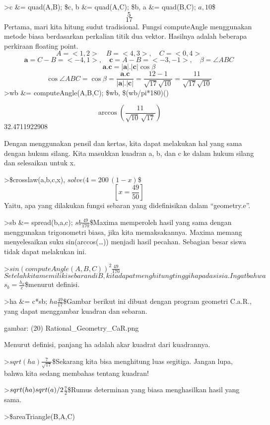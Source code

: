 \documentclass[
]{book}
\begin{document}
\textgreater c \&= quad(A,B); \$c, b \&= quad(A,C); \$b, a \&= quad(B,C); \(a,\)\(10\)\$ \[5\] \[17\]Pertama, mari kita hitung sudut tradisional. Fungsi computeAngle menggunakan metode biasa berdasarkan perkalian titik dua vektor. Hasilnya adalah beberapa perkiraan floating point. \[A=<1,2>\quad B=<4,3>,\quad C=<0,4>\] \[\mathbf{a}=C-B=<-4,1>,\quad \mathbf{c}=A-B=<-3,-1>,\quad \beta=\angle ABC\] \[\mathbf{a}.\mathbf{c}=|\mathbf{a}|.|\mathbf{c}|\cos \beta\] \[\cos \angle ABC =\cos\beta=\frac{\mathbf{a}.\mathbf{c}}{|\mathbf{a}|.|\mathbf{c}|}=\frac{12-1}{\sqrt{17}\sqrt{10}}=\frac{11}{\sqrt{17}\sqrt{10}}\] \textgreater wb \&= computeAngle(A,B,C); \$wb, \$(wb/pi*180)()

\[\arccos \left(\frac{11}{\sqrt{10}\,\sqrt{17}}\right)\] 32.4711922908

Dengan menggunakan pensil dan kertas, kita dapat melakukan hal yang sama dengan hukum silang. Kita masukkan kuadran a, b, dan c ke dalam hukum silang dan selesaikan untuk x.

\textgreater\$crosslaw(a,b,c,x), \(solve(%
\)\(4=200\,\left(1-x\right)\)\$ \[\left[ x=\frac{49}{50} \right]\]Yaitu, apa yang dilakukan fungsi sebaran yang didefinisikan dalam ``geometry.e''.

\textgreater sb \&= spread(b,a,c); \(sb\)\(\frac{49}{170}\)\$Maxima memperoleh hasil yang sama dengan menggunakan trigonometri biasa, jika kita memaksakannya. Maxima memang menyelesaikan suku sin(arccos(\ldots)) menjadi hasil pecahan. Sebagian besar siswa tidak dapat melakukan ini.

\textgreater{}\(sin(computeAngle(A,B,C))^2\)\(\frac{49}{170}\)\(Setelah kita memiliki sebaran di B, kita dapat menghitung tinggi ha
pada sisi a. Ingat bahwa\)\(s_b=\frac{h_a}{c}\)\$menurut definisi.

\textgreater ha \&= c*sb; \(ha\)\(\frac{49}{17}\)\$Gambar berikut ini dibuat dengan program geometri C.a.R., yang dapat menggambar kuadran dan sebaran.

gambar: (20) Rational\_Geometry\_CaR.png

Menurut definisi, panjang ha adalah akar kuadrat dari kuadrannya.

\textgreater{}\(sqrt(ha)\)\(\frac{7}{\sqrt{17}}\)\$Sekarang kita bisa menghitung luas segitiga. Jangan lupa, bahwa kita sedang membahas tentang kuadran!

\textgreater{}\(sqrt(ha)\*sqrt(a)/2\)\(\frac{7}{2}\)\$Rumus determinan yang biasa menghasilkan hasil yang sama.

\textgreater\$areaTriangle(B,A,C)
\end{document}
